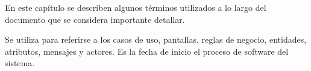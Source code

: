 \label{sec:glosario}
    En este capítulo se describen algunos términos utilizados a lo largo del documento que se considera importante detallar. 
  
\begin{description}
	 Se utiliza para referirse a los casos de uso, pantallas, reglas de negocio, entidades, atributos, mensajes y actores.
	 Es la fecha de inicio el proceso de software del sistema.
	
\end{description}
